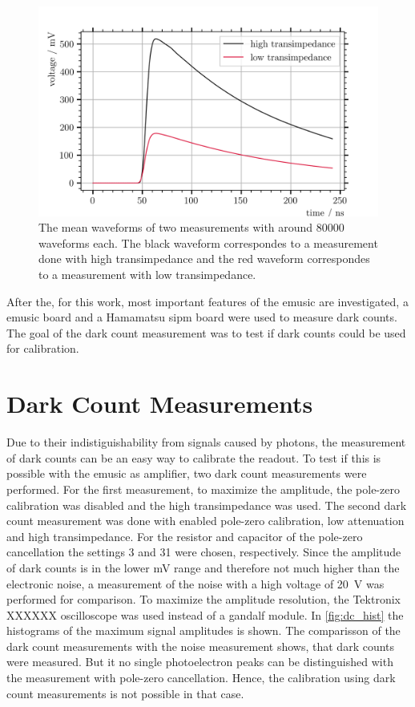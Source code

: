 \begin{figure}
	\centering
	\includegraphics[width=1.\textwidth]{pictures/low_imp_mean_wf}
	\caption[Waveforms measured with low and high transimpedance]{The mean waveforms of two measurements with around \num{80000} waveforms each. The black waveform correspondes to a measurement done with high transimpedance and the red waveform correspondes to a measurement with low transimpedance.}
	\label{fig:low_imp_wf}
\end{figure}

After the, for this work, most important features of the \ac{emusic} are investigated, a \ac{emusic} board and a Hamamatsu \ac{sipm} board were used to measure dark counts.
The goal of the dark count measurement was to test if dark counts could be used for calibration.

\section{Dark Count Measurements}
Due to their indistiguishability from signals caused by photons, the measurement of dark counts can be an easy way to calibrate the readout.
To test if this is possible with the \ac{emusic} as amplifier, two dark count measurements were performed.
For the first measurement, to maximize the amplitude, the pole-zero calibration was disabled and the high transimpedance was used.
The second dark count measurement was done with enabled pole-zero calibration, low attenuation and high transimpedance.
For the resistor and capacitor of the pole-zero cancellation the settings 3 and 31 were chosen, respectively.
Since the amplitude of dark counts is in the lower \si{\milli\volt} range and therefore not much higher than the electronic noise, a measurement of the noise with a high voltage of \SI{20}{\volt} was performed for comparison.
To maximize the amplitude resolution, the Tektronix XXXXXX oscilloscope was used instead of a \ac{gandalf} module.
In \autoref{fig:dc_hist} the histograms of the maximum signal amplitudes is shown. 
The comparisson of the dark count measurements with the noise measurement shows, that dark counts were measured.
But it no single photoelectron peaks can be distinguished with the measurement with pole-zero cancellation.
Hence, the calibration using dark count measurements is not possible in that case.

